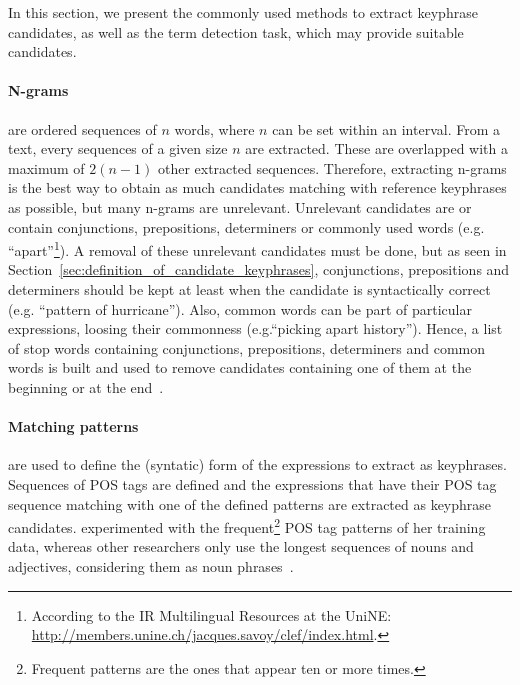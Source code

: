   In this section, we present the commonly used methods to extract keyphrase
  candidates, as well as the term detection task, which may provide suitable
  candidates.

  \paragraph{N-grams} are ordered sequences of $n$ words, where $n$ can be set
  within an interval. From a text, every sequences of a given size $n$ are
  extracted. These are overlapped with a maximum of $2(n - 1)$ other extracted
  sequences. Therefore, extracting n-grams is the best way to obtain as much
  candidates matching with reference keyphrases as possible, but many n-grams
  are unrelevant. Unrelevant candidates are or contain conjunctions,
  prepositions, determiners or commonly used words (e.g.
  ``apart''\footnote{According to the IR Multilingual Resources at the UniNE:
  \url{http://members.unine.ch/jacques.savoy/clef/index.html}.}). A removal of
  these unrelevant candidates must be done, but as seen in
  Section~\ref{sec:definition_of_candidate_keyphrases}, conjunctions,
  prepositions and determiners should be kept at least when the candidate is
  syntactically correct (e.g. ``pattern of hurricane''). Also, common words can %
  be part of particular expressions, loosing their commonness (e.g.``picking %
  apart history''). Hence, a list of stop words containing conjunctions,
  prepositions, determiners and common words is built and used to remove
  candidates containing one of them at the beginning or at the
  end~\cite{witten1999kea,turney1999learningalgorithms}.

  \paragraph{Matching patterns} are used to define the (syntatic) form of the
  expressions to extract as keyphrases. Sequences of POS tags are defined and
  the expressions that have their POS tag sequence matching with one of the
  defined patterns are extracted as keyphrase candidates.
   experimented with the
  frequent\footnote{Frequent patterns are the ones that appear ten or more
  times.} POS tag patterns of her training data, whereas other researchers only
  use the longest sequences of nouns and adjectives, considering them as noun
  phrases~\cite{wan2008expandrank,hassan2010conundrums,bougouin2013topicrank}.

